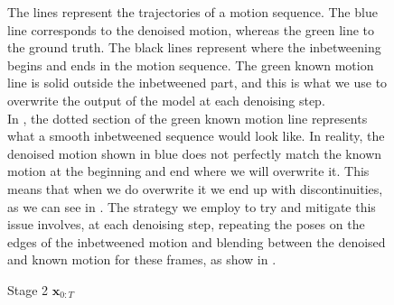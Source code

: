 \begin{figure}
    \centering
    \hfil
    \hfil
    \caption{Stage 2 $\mathbf{x}_{0:T}$}
    \label{fig:diffusion_inbetweening_blending}
    \medskip
    \small
    \raggedright
    The lines represent the trajectories of a motion sequence. The blue line corresponds to the denoised motion, whereas the green line to the ground truth. The black lines represent where the inbetweening begins and ends in the motion sequence. The green known motion line is solid outside the inbetweened part, and this is what we use to overwrite the output of the model at each denoising step.\\
    In \protect{}, the dotted section of the green known motion line represents what a smooth inbetweened sequence would look like. In reality, the denoised motion shown in blue does not perfectly match the known motion at the beginning and end where we will overwrite it. This means that when we do overwrite it we end up with discontinuities, as we can see in \protect{}. The strategy we employ to try and mitigate this issue involves, at each denoising step, repeating the poses on the edges of the inbetweened motion and blending between the denoised and known motion for these frames, as show in \protect{}.
\end{figure}
